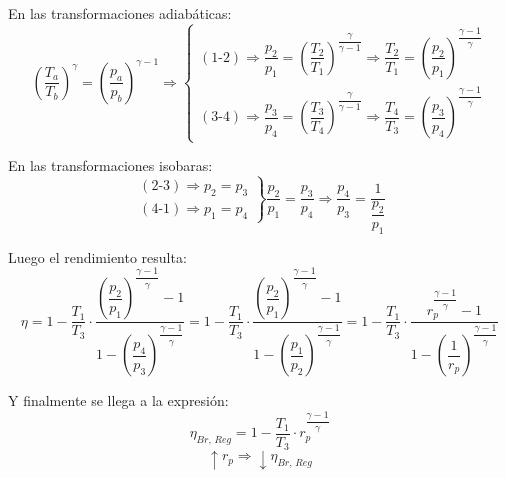 			En las transformaciones adiabáticas:
			\[\left(\dfrac{T_a}{T_b}\right)^\gamma = \left(\dfrac{p_a}{p_b}\right)^{\gamma-1} \Rightarrow \left\{
			\begin{matrix}
				(\text{1-2})\Rightarrow \dfrac{p_2}{p_1} = \left(\dfrac{T_2}{T_1}\right)^{\dfrac{\gamma}{\gamma-1}} \Rightarrow \dfrac{T_2}{T_1} = \left(\dfrac{p_2}{p_1}\right)^{\dfrac{\gamma-1}{\gamma}}\\
				(\text{3-4})\Rightarrow \dfrac{p_3}{p_4} = \left(\dfrac{T_3}{T_4}\right)^{\dfrac{\gamma}{\gamma-1}} \Rightarrow \dfrac{T_4}{T_3} = \left(\dfrac{p_3}{p_4}\right)^{\dfrac{\gamma-1}{\gamma}}
			\end{matrix}
			\right.
			\]
			
			En las transformaciones isobaras:
			\[\left.
			\begin{matrix}
				(\text{2-3})\Rightarrow p_2 = p_3\\
				(\text{4-1})\Rightarrow p_1 = p_4
			\end{matrix}
			\right\}
			\dfrac{p_2}{p_1} = \dfrac{p_3}{p_4} \Rightarrow \dfrac{p_4}{p_3} = \dfrac{1}{\dfrac{p_2}{p_1}}
			\]
			
			Luego el rendimiento resulta:
			\[\eta = 1-\dfrac{T_1}{T_3}\cdot \dfrac{\left(\dfrac{p_2}{p_1}\right)^{\dfrac{\gamma-1}{\gamma}} - 1}{1 - \left(\dfrac{p_4}{p_3}\right)^{\dfrac{\gamma-1}{\gamma}}} = 1-\dfrac{T_1}{T_3}\cdot \dfrac{\left(\dfrac{p_2}{p_1}\right)^{\dfrac{\gamma-1}{\gamma}} - 1}{1 - \left(\dfrac{p_1}{p_2}\right)^{\dfrac{\gamma-1}{\gamma}}} = 1-\dfrac{T_1}{T_3}\cdot \dfrac{r_p^{\dfrac{\gamma-1}{\gamma}} - 1}{1 - \left(\dfrac{1}{r_p}\right)^{\dfrac{\gamma-1}{\gamma}}}\]
			
			Y finalmente se llega a la expresión:
			\[\eta_{Br,\,Reg} = 1-\dfrac{T_1}{T_3}\cdot r_p^{\dfrac{\gamma-1}{\gamma}}\]
			\[\uparrow r_p \Rightarrow \downarrow \eta_{Br,\,Reg}\]
			
		
		
